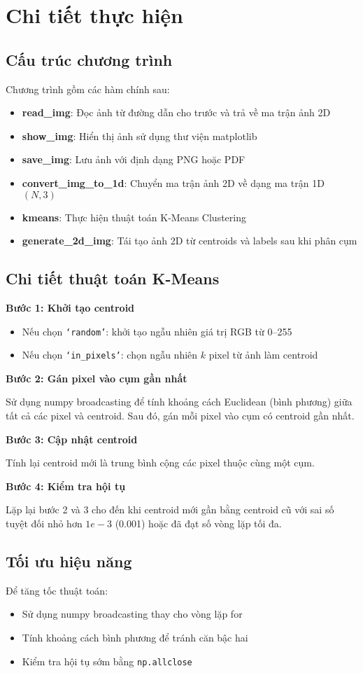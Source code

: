 \section{Chi tiết thực hiện}

\subsection{Cấu trúc chương trình}
Chương trình gồm các hàm chính sau:

\begin{itemize}
    \item \textbf{read\_img}: Đọc ảnh từ đường dẫn cho trước và trả về ma trận ảnh 2D
    \item \textbf{show\_img}: Hiển thị ảnh sử dụng thư viện matplotlib
    \item \textbf{save\_img}: Lưu ảnh với định dạng PNG hoặc PDF
    \item \textbf{convert\_img\_to\_1d}: Chuyển ma trận ảnh 2D về dạng ma trận 1D \((N, 3)\)
    \item \textbf{kmeans}: Thực hiện thuật toán K-Means Clustering
    \item \textbf{generate\_2d\_img}: Tái tạo ảnh 2D từ centroids và labels sau khi phân cụm
\end{itemize}

\subsection{Chi tiết thuật toán K-Means}

\textbf{Bước 1: Khởi tạo centroid}
\begin{itemize}
    \item Nếu chọn \texttt{`random'}: khởi tạo ngẫu nhiên giá trị RGB từ 0–255
    \item Nếu chọn \texttt{`in\_pixels'}: chọn ngẫu nhiên \(k\) pixel từ ảnh làm centroid
\end{itemize}

\textbf{Bước 2: Gán pixel vào cụm gần nhất}

Sử dụng numpy broadcasting để tính khoảng cách Euclidean (bình phương) giữa tất cả các pixel và centroid.
Sau đó, gán mỗi pixel vào cụm có centroid gần nhất.

\textbf{Bước 3: Cập nhật centroid}

Tính lại centroid mới là trung bình cộng các pixel thuộc cùng một cụm.

\textbf{Bước 4: Kiểm tra hội tụ}

Lặp lại bước 2 và 3 cho đến khi centroid mới gần bằng centroid cũ với sai số tuyệt đối nhỏ hơn \(1e-3\) (0.001) hoặc đã đạt số vòng lặp tối đa.

\subsection{Tối ưu hiệu năng}
Để tăng tốc thuật toán:
\begin{itemize}
    \item Sử dụng numpy broadcasting thay cho vòng lặp for
    \item Tính khoảng cách bình phương để tránh căn bậc hai
    \item Kiểm tra hội tụ sớm bằng \texttt{np.allclose}
\end{itemize}

